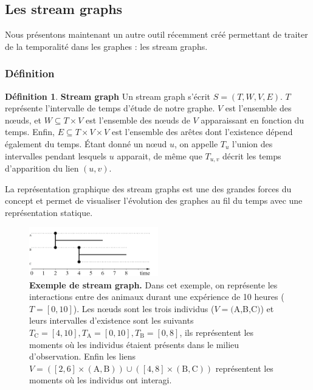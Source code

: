\documentclass[11pt,a4paper]{article}
\theoremstyle{definition}
\newtheorem{defn}{Définition}
\theoremstyle{remark}
\theoremstyle{remark}
\def \stg {stream graph}
\def \Stg {Stream graph}
\def \stgs {stream graphs}
\begin{document}
\subsection{Les \stgs }

Nous présentons maintenant un autre outil récemment créé permettant de traiter de la temporalité dans les graphes : les \stgs .
\subsubsection{Définition}

\begin{defn}{\textbf{\Stg}}
Un \stg{} s'écrit $S=(T,W,V,E)$. $T$ représente l'intervalle de temps d'étude de notre graphe. $V$ est l'ensemble des nœuds, et $W \subseteq T \times V$ est l'ensemble des nœuds de $V$ apparaissant en fonction du temps. Enfin, $E \subseteq T \times V \times V$ est l'ensemble des arêtes dont l'existence dépend également du temps. Étant donné un nœud $u$, on appelle $T_u$ l'union des intervalles pendant lesquels $u$ apparait, de même que $T_{u,v}$ décrit les temps d'apparition du lien $(u,v)$.
\end{defn}

La représentation graphique des \stgs{} est une des grandes forces du concept et permet de visualiser l'évolution des graphes au fil du temps avec une représentation statique.

\begin{figure}[H]
\centering
\includegraphics[width=0.5\textwidth]{exStreamGraph.JPG}
\caption{\textbf{Exemple de stream graph.} Dans cet exemple, on représente les interactions entre des animaux durant une expérience de 10 heures ($T=[0,10]$). Les nœuds sont les trois individus ($V=($A,B,C$)$) et leurs intervalles d'existence sont les suivants $T_{\text{C}}=[4,10], T_{\text{A}}=[0,10], T_{\text{B}}=[0,8]$, ils représentent les moments où les individus étaient présents dans le milieu d'observation. Enfin les liens $V=([2,6]\times (\text{A},\text{B})) \cup ([4,8]\times(\text{B},\text{C}))$ représentent les moments où les individus ont interagi.}
\label{exstreamgraph}
\end{figure}
\end{document}
